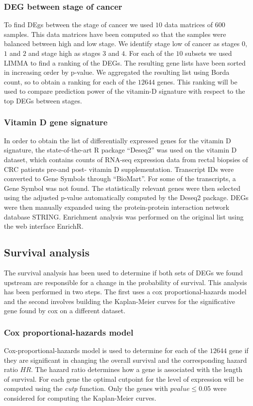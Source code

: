 \documentclass[fleqn,10pt]{SelfArx} %
\begin{document}
		\subsubsection{DEG between stage of cancer}
			To find DEgs between the stage of cancer we used $10$ data matrices of $600$ samples.
			This data matrices have been computed so that the samples were balanced between high and low stage.
			We identify stage low of cancer as stages $0$, $1$ and $2$ and stage high as stages $3$ and $4$.
			For each of the $10$ subsets we used LIMMA to find a ranking of the DEGs.
			The resulting gene lists have been sorted in increasing order by p-value.
			We aggregated the resulting list using Borda count, so to obtain a ranking for each of the $12644$ genes.
			This ranking will be used to compare prediction power of the vitamin-D signature with respect to the top DEGs between stages.

		\subsubsection{Vitamin D gene signature}
			In order to obtain the list of differentially expressed genes for the vitamin D signature, the state-of-the-art R package “Deseq2” was used on the vitamin D dataset, which contains counts of RNA-seq expression data from rectal biopsies of CRC patients pre-and post- vitamin D supplementation. Transcript IDs were converted to Gene Symbols through “BioMart”. For some of the transcripts, a Gene Symbol was not found. The statistically relevant genes were then selected using the adjusted p-value automatically computed by the Deseq2 package. DEGs were then manually expanded using the protein-protein interaction network database STRING.
			Enrichment analysis was performed on the original list using the web interface EnrichR.


	\subsection{Survival analysis}
		The survival analysis has been used to determine if both sets of DEGs we found upstream are responsible for a change in the probability of survival.
		This analysis has been performed in two steps.
		The first uses a cox proportional-hazards model and the second involves building the Kaplan-Meier curves for the significative gene found by cox on a different dataset.

		\subsubsection{Cox proportional-hazards model}
			Cox-proportional-hazards model is used to determine for each of the $12644$ gene if they are significant in changing the overall survival and the corresponding hazard ratio $HR$.
			The hazard ratio determines how a gene is associated with the length of survival.
			For each gene the optimal cutpoint for the level of expression will be computed using the \emph{cutp} function.
			Only the genes with $pvalue \le 0.05$ were considered for computing the Kaplan-Meier curves.
\end{document}
